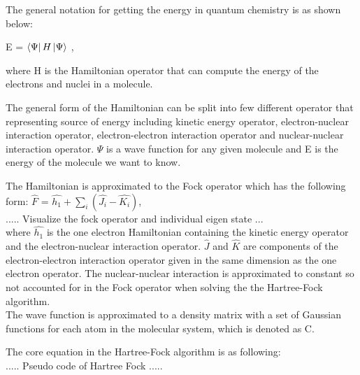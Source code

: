 \documentclass[twoside]{article}
\begin{document}
The general notation for getting the energy in quantum chemistry is as shown below:

E = $\Bra{\Psi}H\Ket{\Psi}$ ,

where H is the Hamiltonian operator that can compute the energy of the electrons and nuclei in a molecule. 

The general form of the Hamiltonian can be split into few different operator that representing source of energy 
including kinetic energy operator, electron-nuclear interaction operator, electron-electron interaction operator and nuclear-nuclear interaction operator.
$\Psi$ is a wave function for any given molecule and E is the energy of the molecule we want to know.

The Hamiltonian is approximated to the Fock operator which has the following form:
$\hat{F}$ = $\hat{h_1} + \sum\limits_{i}(\hat{J_i} - \hat{K_i})$, \\

..... Visualize the fock operator and individual eigen state ... \\

where $\hat{h_1}$ is the one electron Hamiltonian containing the kinetic energy operator and the electron-nuclear interaction operator. $\hat{J}$ and $\hat{K}$ are components of the electron-electron interaction operator given in the same dimension as the one electron operator. The nuclear-nuclear interaction is approximated to constant so not accounted for in the Fock operator when solving the the Hartree-Fock algorithm. \\

The wave function is approximated to a density matrix with a set of Gaussian functions for each atom in the molecular system, which is denoted as C. 




The core equation in the Hartree-Fock algorithm is as following: \\

..... Pseudo code of Hartree Fock ..... \\


\end{document}
